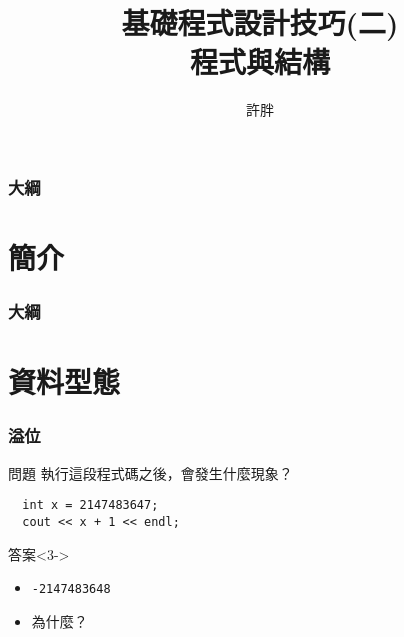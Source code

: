 \documentclass[utf8]{beamer}
\begin{document}
\begin{CJK}{UTF8}{bkai}

\title{基礎程式設計技巧(二)\\程式與結構}
\author{許胖}

\begin{frame}
  \titlepage
\end{frame}
\begin{frame}
  \frametitle{大綱}
  \begin{multicols}{2}
    \tableofcontents
  \end{multicols}
\end{frame}

\section{簡介}
\begin{frame}
  \frametitle{大綱}
  \begin{multicols}{2}
    \tableofcontents[currentsection]
  \end{multicols}
\end{frame}

\section{資料型態}

\begin{frame}[fragile]
  \frametitle{溢位}
  \begin{block}{問題}
  執行這段程式碼之後，會發生什麼現象？
  \pause
  \begin{lstlisting}
  int x = 2147483647;
  cout << x + 1 << endl;
  \end{lstlisting}
  \end{block}
  \begin{exampleblock}{答案}<3->
    \begin{itemize}
    \item \texttt{-2147483648}
    \item<4-> 為什麼？
    \end{itemize}
  \end{exampleblock}
\end{frame}


\end{CJK}
\end{document}
